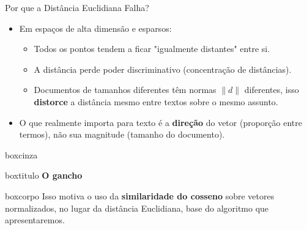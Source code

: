 \documentclass[aspectratio=43]{beamer}
\begin{document}
\begin{frame}[t]{Por que a Distância Euclidiana Falha?}

\vspace{0.1cm}

\begin{itemize}
    \vspace{0.1cm}

    \item Em espaços de alta dimensão e esparsos:
    \begin{itemize}
        \item Todos os pontos tendem a ficar "igualmente distantes" entre si.
        \item A distância perde poder discriminativo (concentração de distâncias).
        \item Documentos de tamanhos diferentes têm normas $\|d\|$ diferentes, isso \textbf{distorce} a distância mesmo entre textos sobre o mesmo assunto.
    \end{itemize}

    \vspace{0.1cm}

    \item O que realmente importa para texto é a \textbf{direção} do vetor (proporção entre termos), não sua magnitude (tamanho do documento).

\end{itemize}

\vfill

\begin{center}
\begin{beamercolorbox}[wd=0.80\paperwidth, sep=0pt]{boxcinza}
  \begin{beamercolorbox}[wd=0.80\paperwidth, ht=0.55cm, dp=0.12cm, leftskip=0.25cm]{boxtitulo}
    {\color{uelgreen}\textbf{O gancho}}
  \end{beamercolorbox}
  \begin{beamercolorbox}[wd=0.80\paperwidth, sep=0.3cm]{boxcorpo}
    \small
    Isso motiva o uso da \textbf{similaridade do cosseno} sobre vetores normalizados, no lugar da distância Euclidiana, base do algoritmo que apresentaremos.
  \end{beamercolorbox}
\end{beamercolorbox}
\end{center}

\end{frame}
\end{document}
